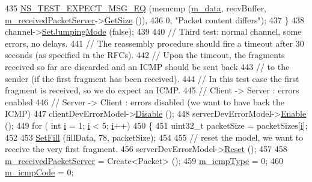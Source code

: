 \begin{DoxyCode}
435       \hyperlink{group__testing_ga7304ba46a28d8cf08dfdfd6499cf7068}{NS\_TEST\_EXPECT\_MSG\_EQ} (memcmp (\hyperlink{classIpv6FragmentationTest_af7b77e77aad9b5667512c25a3f7eef83}{m\_data}, recvBuffer, 
      \hyperlink{classIpv6FragmentationTest_abe697e5a49ddbe098865a13c306d2f94}{m\_receivedPacketServer}->\hyperlink{classns3_1_1Packet_a462855c9929954d4301a4edfe55f4f1c}{GetSize} ()),
436                              0, \textcolor{stringliteral}{"Packet content differs"});
437     \}
438   channel->\hyperlink{classns3_1_1ErrorChannel_aa30b3b76ca1fc19aa68e28bd21431131}{SetJumpingMode} (\textcolor{keyword}{false});
439 
440   \textcolor{comment}{// Third test: normal channel, some errors, no delays.}
441   \textcolor{comment}{// The reassembly procedure should fire a timeout after 30 seconds (as specified in the RFCs).}
442   \textcolor{comment}{// Upon the timeout, the fragments received so far are discarded and an ICMP should be sent back}
443   \textcolor{comment}{// to the sender (if the first fragment has been received).}
444   \textcolor{comment}{// In this test case the first fragment is received, so we do expect an ICMP.}
445   \textcolor{comment}{// Client -> Server : errors enabled}
446   \textcolor{comment}{// Server -> Client : errors disabled (we want to have back the ICMP)}
447   clientDevErrorModel->\hyperlink{classns3_1_1ErrorModel_a55d35a3e713c31f650577e9f96cf25c0}{Disable} ();
448   serverDevErrorModel->\hyperlink{classns3_1_1ErrorModel_a571d61a2fc9ce2d30df95da7e87b763c}{Enable} ();
449   \textcolor{keywordflow}{for} ( \textcolor{keywordtype}{int} \hyperlink{bernuolliDistribution_8m_a6f6ccfcf58b31cb6412107d9d5281426}{i} = 1; \hyperlink{bernuolliDistribution_8m_a6f6ccfcf58b31cb6412107d9d5281426}{i} < 5; \hyperlink{bernuolliDistribution_8m_a6f6ccfcf58b31cb6412107d9d5281426}{i}++)
450     \{
451       uint32\_t packetSize = packetSizes[\hyperlink{bernuolliDistribution_8m_a6f6ccfcf58b31cb6412107d9d5281426}{i}];
452 
453       \hyperlink{classIpv6FragmentationTest_a6143375e886a978a720812a578767ab3}{SetFill} (fillData, 78, packetSize);
454 
455       \textcolor{comment}{// reset the model, we want to receive the very first fragment.}
456       serverDevErrorModel->\hyperlink{classns3_1_1ErrorModel_a6b7cbe56c27562e5ba6daf2f04bcd282}{Reset} ();
457 
458       \hyperlink{classIpv6FragmentationTest_abe697e5a49ddbe098865a13c306d2f94}{m\_receivedPacketServer} = Create<Packet> ();
459       \hyperlink{classIpv6FragmentationTest_ae933968023c4913c690cb92eb06fa9f8}{m\_icmpType} = 0;
460       \hyperlink{classIpv6FragmentationTest_a6d12c2608f87aa36c54cd9d7bdf3e558}{m\_icmpCode} = 0;

\end{DoxyCode}
